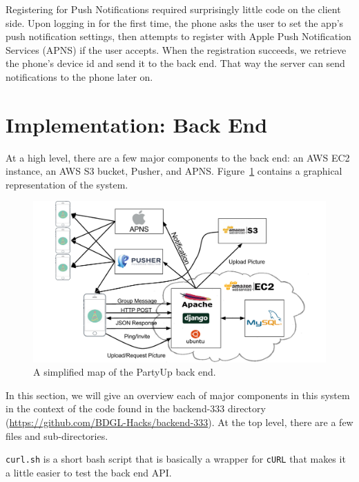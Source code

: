 \documentclass[12pt]{article}
\begin{document}
Registering for Push Notifications required surprisingly little code on the client side. Upon logging in for
the first time, the phone asks the user to set the app's push notification settings, then attempts
to register with Apple Push Notification Services (APNS) if the user accepts. When the registration
succeeds, we retrieve the phone's device id and send it to the back end. That way the server can
send notifications to the phone later on.


\section{Implementation: Back End}

At a high level, there are a few major components to the back end:
an AWS EC2 instance, an AWS S3 bucket, Pusher, and APNS.
Figure~\ref{fig:stack} contains a graphical representation of the system.

\begin{figure}[h]
    \centering
    \includegraphics[scale=0.4]{Stack.png}
    \caption{
        A simplified map of the PartyUp back end. 
    }
    \label{fig:stack}
\end{figure}


In this section, we will give an overview each of major components in this system
in the context of the code found in the
backend-333 directory (\url{https://github.com/BDGL-Hacks/backend-333}).
At the top level, there are a few files and sub-directories.

\texttt{curl.sh} is a short bash script that is basically a wrapper for 
\texttt{cURL} that makes it a little easier to test the back end API.
\end{document}
